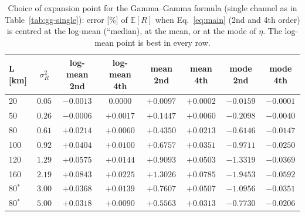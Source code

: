 \begin{table}[htbp]
\centering\small
\caption{Choice of expansion point for the Gamma--Gamma formula (single channel as in Table~\ref{tab:gg-single}): error [\%] of $\mathbb E[R]$ when Eq.~\eqref{eq:main} (2nd and 4th order) is centred at the log-mean (``median), at the mean, or at the mode of $\eta$. The log-mean point is best in every row.}
\label{tab:expoint}
\begin{tabular}{lccccccc}
\toprule
L [km] & $\sigma_R^2$ & log-mean 2nd & log-mean 4th & mean 2nd & mean 4th & mode 2nd & mode 4th\\
\midrule
20 & $0.05$ & $-0.0013$ & $0.0000$ & $+0.0097$ & $+0.0002$ & $-0.0159$ & $-0.0001$ \\
50 & $0.26$ & $-0.0006$ & $+0.0017$ & $+0.1447$ & $+0.0060$ & $-0.2098$ & $-0.0040$ \\
80 & $0.61$ & $+0.0214$ & $+0.0060$ & $+0.4350$ & $+0.0213$ & $-0.6146$ & $-0.0147$ \\
100 & $0.92$ & $+0.0404$ & $+0.0100$ & $+0.6757$ & $+0.0351$ & $-0.9711$ & $-0.0250$ \\
120 & $1.29$ & $+0.0575$ & $+0.0144$ & $+0.9093$ & $+0.0503$ & $-1.3319$ & $-0.0369$ \\
160 & $2.19$ & $+0.0843$ & $+0.0225$ & $+1.3026$ & $+0.0785$ & $-1.9453$ & $-0.0592$ \\
80$^{*}$ & $3.00$ & $+0.0368$ & $+0.0139$ & $+0.7607$ & $+0.0507$ & $-1.0956$ & $-0.0351$ \\
80$^{*}$ & $5.00$ & $+0.0318$ & $+0.0090$ & $+0.5563$ & $+0.0313$ & $-0.7730$ & $-0.0206$ \\

\bottomrule
\end{tabular}
\end{table}

